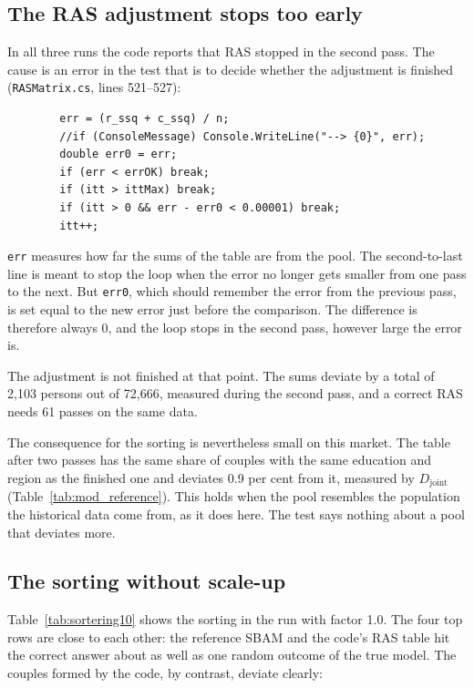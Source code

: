 \documentclass[12pt,a4paper]{article}
\newcommand{\kode}[1]{\texttt{#1}}
\begin{document}
\subsection{The RAS adjustment stops too early}\label{sec:ras}

In all three runs the code reports that RAS stopped in the second pass. The cause is an error in
the test that is to decide whether the adjustment is finished (\kode{RASMatrix.cs}, lines 521--527):

{\small
\begin{verbatim}
        err = (r_ssq + c_ssq) / n;
        //if (ConsoleMessage) Console.WriteLine("--> {0}", err);
        double err0 = err;
        if (err < errOK) break;
        if (itt > ittMax) break;
        if (itt > 0 && err - err0 < 0.00001) break;
        itt++;
\end{verbatim}
}

\kode{err} measures how far the sums of the table are from the pool. The second-to-last line is
meant to stop the loop when the error no longer gets smaller from one pass to the next. But
\kode{err0}, which should remember the error from the previous pass, is set equal to the new error
just before the comparison. The difference is therefore always 0, and the loop stops in the second
pass, however large the error is.

The adjustment is not finished at that point. The sums deviate by a total of 2,103 persons out of
72,666, measured during the second pass, and a correct RAS needs 61 passes on the same data.

The consequence for the sorting is nevertheless small on this market. The table after two passes
has the same share of couples with the same education and region as the finished one and deviates
0.9 per cent from it, measured by $D_{\text{joint}}$ (Table~\ref{tab:mod_reference}). This holds
when the pool resembles the population the historical data come from, as it does here. The test
says nothing about a pool that deviates more.

\subsection{The sorting without scale-up}

Table~\ref{tab:sortering10} shows the sorting in the run with factor 1.0. The four top rows are
close to each other: the reference SBAM and the code's RAS table hit the correct answer about as
well as one random outcome of the true model. The couples formed by the code, by contrast, deviate
clearly:
\end{document}
